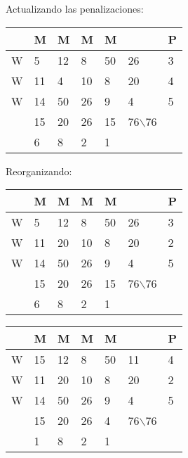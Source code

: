 \documentclass{article}
\begin{document}
Actualizando las penalizaciones:

\begin{center}
    \begin{tabular}{|l|l|l|l|l|l|l|}
\hline
 & M & M & M & M &  & P \\ \hline
W & \cellcolor[HTML]{67FD9A}5 & \cellcolor[HTML]{67FD9A}12 & \cellcolor[HTML]{67FD9A}8 & \cellcolor[HTML]{67FD9A}50 & 26 & 3 \\ \hline
W & \cellcolor[HTML]{67FD9A}11 & \cellcolor[HTML]{67FD9A}4 & \cellcolor[HTML]{67FD9A}10 & \cellcolor[HTML]{67FD9A}8 & 20 & 4 \\ \hline
W & \cellcolor[HTML]{67FD9A}14 & \cellcolor[HTML]{67FD9A}50 & \cellcolor[HTML]{FFC702}26 & \cellcolor[HTML]{67FD9A}9 & 4 & 5 \\ \hline
 & 15 & 20 & 26 & 15 & 76$\backslash$76 &  \\ \hline
 & 6 & \cellcolor[HTML]{FE0000}8 & 2 & 1 &  &  \\ \hline
\end{tabular}
\end{center}
Reorganizando:
\begin{center}
    \begin{tabular}{|l|l|l|l|l|l|l|}
\hline
 & M & M & M & M &  & P \\ \hline
W & \cellcolor[HTML]{34FF34}5 & \cellcolor[HTML]{34FF34}12 & \cellcolor[HTML]{34FF34}8 & \cellcolor[HTML]{34FF34}50 & 26 & 3 \\ \hline
W & \cellcolor[HTML]{34FF34}11 & \cellcolor[HTML]{34FF34}20 & \cellcolor[HTML]{34FF34}10 & \cellcolor[HTML]{34FF34}8 & 20 & 2 \\ \hline
W & \cellcolor[HTML]{34FF34}14 & \cellcolor[HTML]{34FF34}50 & \cellcolor[HTML]{34FF34}26 & \cellcolor[HTML]{34FF34}9 & 4 & 5 \\ \hline
 & 15 & 20 & 26 & 15 & 76$\backslash$76 &  \\ \hline
 & \cellcolor[HTML]{FE0000}6 & 8 & 2 & 1 &  &  \\ \hline
\end{tabular}
\end{center}

\begin{center}
    \begin{tabular}{|l|l|l|l|l|l|l|}
\hline
 & M & M & M & M &  & P \\ \hline
W & \cellcolor[HTML]{34FF34}15 & \cellcolor[HTML]{34FF34}12 & \cellcolor[HTML]{34FF34}8 & \cellcolor[HTML]{34FF34}50 & 11 & \cellcolor[HTML]{FE0000}4 \\ \hline
W & \cellcolor[HTML]{34FF34}11 & \cellcolor[HTML]{34FF34}20 & \cellcolor[HTML]{34FF34}10 & \cellcolor[HTML]{34FF34}8 & 20 & 2 \\ \hline
W & \cellcolor[HTML]{34FF34}14 & \cellcolor[HTML]{34FF34}50 & \cellcolor[HTML]{34FF34}26 & \cellcolor[HTML]{34FF34}9 & 4 & 5 \\ \hline
 & 15 & 20 & 26 & 4 & 76$\backslash$76 &  \\ \hline
 & 1 & 8 & 2 & 1 &  &  \\ \hline
\end{tabular}
\end{center}
\end{document}

